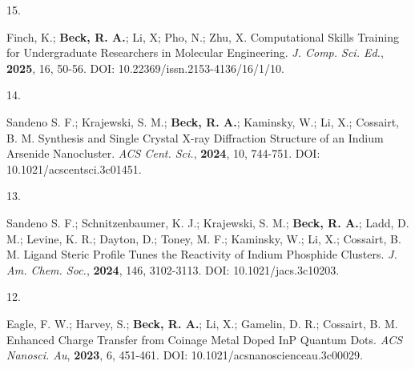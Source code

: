 

\begin{cvpublications}


\cvpublication
{15.}
{\parbox[t]{0.95\textwidth}{\strut Finch, K.; \textbf{Beck, R. A.}; Li, X; Pho, N.; Zhu, X.
Computational Skills Training for Undergraduate Researchers in Molecular Engineering.
\textit{J. Comp. Sci. Ed.}, \textbf{2025}, 16, 50-56.
DOI: 10.22369/issn.2153-4136/16/1/10.}}



\cvpublication
{14.}
{\parbox[t]{0.95\textwidth}{\strut Sandeno S. F.; Krajewski, S. M.; \textbf{Beck, R. A.}; Kaminsky, W.; Li, X.; Cossairt, B. M.
Synthesis and Single Crystal X-ray Diffraction Structure of an Indium Arsenide Nanocluster.
\textit{ACS Cent. Sci.}, \textbf{2024}, 10, 744-751.
DOI: 10.1021/acscentsci.3c01451.}}



\cvpublication
{13.}
{\parbox[t]{0.95\textwidth}{\strut Sandeno S. F.; Schnitzenbaumer, K. J.; Krajewski, S. M.; \textbf{Beck, R. A.}; Ladd, D. M.; Levine, K. R.; Dayton, D.; Toney, M. F.; Kaminsky, W.; Li, X.; Cossairt, B. M.
Ligand Steric Profile Tunes the Reactivity of Indium Phosphide Clusters.
\textit{J. Am. Chem. Soc.}, \textbf{2024}, 146, 3102-3113.
DOI: 10.1021/jacs.3c10203.}}



\cvpublication
{12.}
{\parbox[t]{0.95\textwidth}{\strut Eagle, F. W.; Harvey, S.; \textbf{Beck, R. A.}; Li, X.; Gamelin, D. R.; Cossairt, B. M.
Enhanced Charge Transfer from Coinage Metal Doped InP Quantum Dots.
\textit{ACS Nanosci. Au}, \textbf{2023}, 6, 451-461.
DOI: 10.1021/acsnanoscienceau.3c00029.}}


\end{cvpublications}
